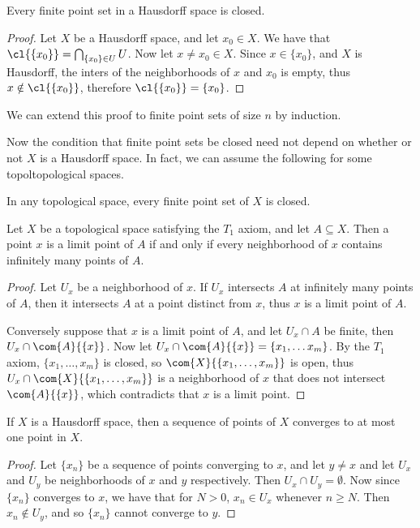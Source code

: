 \begin{theorem}\label{1.6.8}
    Every finite point set in a Hausdorff space is closed.
\end{theorem}
\begin{proof}
    Let $X$ be a Hausdorff space, and let  $x_0 \in X$. We have that
    $\cl{\{x_0\}}=\bigcap_{\{x_0\} \in U}{U}$. Now let $x \neq x_0 \in X$.
    Since $x \in \{x_0\}$, and $X$ is Hausdorff, the inters of the neighborhoods
    of $x$ and  $ x_0$ is empty, thus $x \notin \cl{\{x_0\}}$, therefore
    $\cl{\{x_0\}}=\{x_0\}$.
\end{proof}
\begin{remark}
    We can extend this proof to finite point sets of size $n$ by induction.
\end{remark}

Now the condition that finite point sets be closed need not depend on whether or
not $X$ is a Hausdorff space. In fact, we can assume the following for some
topoltopological spaces.

\begin{axiom}\label{axm1.6.1}
    In any topological space, every finite point set of $X$ is closed.
\end{axiom}

\begin{theorem}\label{1.6.10}
    Let $X$ be a topological space satisfying the $ T_1$ axiom, and let $A
    \subseteq X$. Then a point  $x$ is a limit point of  $A$ if and only if
    every neighborhood of  $x$ contains infinitely many points of  $A$.
\end{theorem}
\begin{proof}
    Let $U_x$ be a neighborhood of  $x$. If  $U_x$ intersects $A$ at infinitely
    many points of  $A$, then it intersects  $A$ at a point distinct from  $x$,
    thus  $x$ is a limit point of  $A$.

    Conversely suppose that  $x$ is a limit point of  $A$, and let  $U_x \cap A$
    be finite, then  $U_x \cap \com{A}{\{x\}}$. Now let  $U_x \cap
    \com{A}{\{x\}}=\{x_1, \dots x_m\}$. By the $T_1$ axiom,  $\{x_1, \dots,
    x_m\}$ is closed, so $\com{X}{\{x_1, \dots,
    x_m\}}$ is open, thus $U_x \cap \com{X}{\{x_1, \dots,
    x_m\}}$ is a neighborhood of $x$ that does not intersect  $\com{A}{\{x\}}$,
    which contradicts that  $x$ is a limit point.
\end{proof}

\begin{theorem}\label{1.6.11}
    If $X$ is a Hausdorff space, then a sequence of points of  $X$ converges to
    at most one point in  $X$.
\end{theorem}
\begin{proof}
    Let $\{x_n\}$ be a sequence of points converging to $x$, and let  $y \neq x$
    and let  $U_x$ and  $U_y$ be neighborhoods of  $x$ and  $y$ respectively.
    Then $U_x \cap U_y = \emptyset$. Now since  $\{x_n\}$ converges to  $x$, we
    have that for $N>0$, $x_n \in U_x$ whenever $n \geq N$. Then $x_n \notin
    U_y$, and so  $\{x_n\}$ cannot converge to  $y$.
\end{proof}

